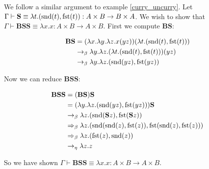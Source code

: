 \begin{example}\label{swap_swap}
    We follow a similar argument to example \ref{curry_uncurry}. Let $\Gamma \vdash \mathbf{S} \equiv \lambda t . (\mathrm{snd}(t), \mathrm{fst}(t)) : A \times B \to B \times A$. We wish to show that $\Gamma \vdash \mathbf{B}\mathbf{S}\mathbf{S} \equiv \lambda x . x : A \times B \to A \times B$. First we compute $\mathbf{B}\mathbf{S}$:
    
    \begin{equation*}
        \begin{aligned}
            \mathbf{B}\mathbf{S} &= (\lambda x . \lambda y. \lambda z . x(yz))(\lambda t . (\mathrm{snd}(t),\mathrm{fst}(t))) \\
            &\to_\beta \lambda y . \lambda z . (\lambda t . (\mathrm{snd}(t), \mathrm{fst}(t)))(y z) \\
            &\to_\beta \lambda y . \lambda z . (\mathrm{snd}(yz), \mathrm{fst}(yz)) 
        \end{aligned}
    \end{equation*}
    
    Now we can reduce $\mathbf{B}\mathbf{S}\mathbf{S}$:
    
    \begin{equation*}
        \begin{aligned}
            \mathbf{B}\mathbf{S}\mathbf{S} &= (\mathbf{B} \mathbf{S})\mathbf{S} \\
            &= (\lambda y. \lambda z. (\mathrm{snd} (yz), \mathrm{fst}(yz)))\mathbf{S} \\
            &\to_\beta \lambda z. (\mathrm{snd} (\mathbf{S} z), \mathrm{fst}(\mathbf{S} z)) \\
            &\Rightarrow_\beta \lambda z. (\mathrm{snd} (\mathrm{snd}(z), \mathrm{fst}(z)), \mathrm{fst} (\mathrm{snd}(z), \mathrm{fst}(z))) \\
            &\Rightarrow_\beta \lambda z. (\mathrm{fst}(z), \mathrm{snd}(z)) \\
            &\to_\eta \lambda z . z
        \end{aligned}
    \end{equation*}
    
    So we have shown $\Gamma \vdash \mathbf{B}\mathbf{S}\mathbf{S} \equiv \lambda x . x : A \times B \to A \times B$.
\end{example}





